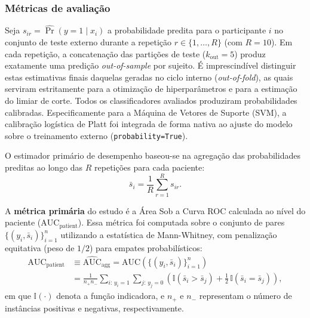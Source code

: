 \documentclass[review]{elsarticle}
\newcommand{\code}[1]{\texttt{#1}}
\begin{document}
	\subsubsection{Métricas de avaliação}\label{subsubsec:evaluation-metrics}
	
	Seja $s_{ir}=\widehat{\Pr}(y=1\mid x_i)$ a probabilidade predita para o participante $i$ no conjunto de teste externo durante a repetição $r\in\{1,\ldots,R\}$ (com $R=10$). Em cada repetição, a concatenação das partições de teste ($k_{\mathrm{out}}=5$) produz exatamente uma predição \emph{out-of-sample} por sujeito. É imprescindível distinguir estas estimativas finais daquelas geradas no ciclo interno (\emph{out-of-fold}), as quais serviram estritamente para a otimização de hiperparâmetros e para a estimação do limiar de corte. Todos os classificadores avaliados produziram probabilidades calibradas. Especificamente para a Máquina de Vetores de Suporte (SVM), a calibração logística de Platt foi integrada de forma nativa ao ajuste do modelo sobre o treinamento externo (\code{probability=True}).
	
	O estimador primário de desempenho baseou-se na agregação das probabilidades preditas ao longo das $R$ repetições para cada paciente:
	\begin{equation}
		\bar{s}_i = \frac{1}{R}\sum_{r=1}^{R}s_{ir}.
		\label{eq:prob-mean}
	\end{equation}
	
	A \textbf{métrica primária} do estudo é a Área Sob a Curva ROC calculada ao nível do paciente ($\mathrm{AUC}_{\mathrm{patient}}$). Essa métrica foi computada sobre o conjunto de pares $\{(y_i,\bar{s}_i)\}_{i=1}^{n}$ utilizando a estatística de Mann-Whitney, com penalização equitativa (peso de $1/2$) para empates probabilísticos:
	\begin{equation}
		\begin{split}
			\mathrm{AUC}_{\mathrm{patient}}
			&\equiv
			\widehat{\mathrm{AUC}}_{\mathrm{agg}}
			= \mathrm{AUC}\!\left(\{(y_i,\bar{s}_i)\}_{i=1}^{n}\right) \\
			&= \frac{1}{n_+ n_-}
			\sum_{i:\,y_i=1} \sum_{j:\,y_j=0}
			\left(
			\mathbb{I}(\bar{s}_i > \bar{s}_j)
			+ \tfrac{1}{2}\,\mathbb{I}(\bar{s}_i = \bar{s}_j)
			\right),
		\end{split}
		\label{eq:auc-patient}
	\end{equation}
	em que $\mathbb{I}(\cdot)$ denota a função indicadora, e $n_+$ e $n_-$ representam o número de instâncias positivas e negativas, respectivamente.
	
\end{document}
